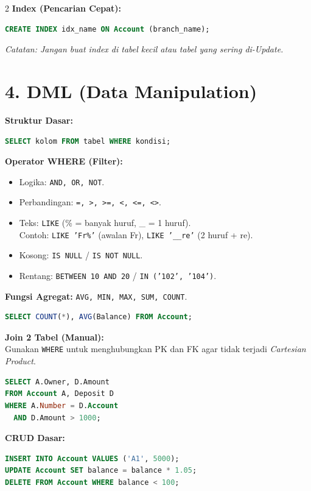 \documentclass[10pt,a4paper]{article}
\begin{document}
\begin{multicols*}{2}
\textbf{Index (Pencarian Cepat):}
\begin{lstlisting}[language=SQL]
CREATE INDEX idx_name ON Account (branch_name);
\end{lstlisting}
\textit{Catatan: Jangan buat index di tabel kecil atau tabel yang sering di-Update.}

\section*{4. DML (Data Manipulation)}

\textbf{Struktur Dasar:}
\begin{lstlisting}[language=SQL]
SELECT kolom FROM tabel WHERE kondisi;
\end{lstlisting}

\textbf{Operator WHERE (Filter):}
\begin{itemize}
    \item Logika: \texttt{AND, OR, NOT}.
    \item Perbandingan: \texttt{=, >, >=, <, <=, <>}.
    \item Teks: \texttt{LIKE} (\% = banyak huruf, \_ = 1 huruf). \\
    Contoh: \texttt{LIKE 'Fr\%'} (awalan Fr), \texttt{LIKE '\_\_re'} (2 huruf + re).
    \item Kosong: \texttt{IS NULL} / \texttt{IS NOT NULL}.
    \item Rentang: \texttt{BETWEEN 10 AND 20} / \texttt{IN ('102', '104')}.
\end{itemize}

\textbf{Fungsi Agregat:} \texttt{AVG, MIN, MAX, SUM, COUNT}.
\begin{lstlisting}[language=SQL]
SELECT COUNT(*), AVG(Balance) FROM Account;
\end{lstlisting}

\textbf{Join 2 Tabel (Manual):} \\
Gunakan \texttt{WHERE} untuk menghubungkan PK dan FK agar tidak terjadi \textit{Cartesian Product}.
\begin{lstlisting}[language=SQL]
SELECT A.Owner, D.Amount
FROM Account A, Deposit D
WHERE A.Number = D.Account 
  AND D.Amount > 1000;
\end{lstlisting}

\textbf{CRUD Dasar:}
\begin{lstlisting}[language=SQL]
INSERT INTO Account VALUES ('A1', 5000);
UPDATE Account SET balance = balance * 1.05;
DELETE FROM Account WHERE balance < 100;
\end{lstlisting}


\end{multicols*}
\end{document}
